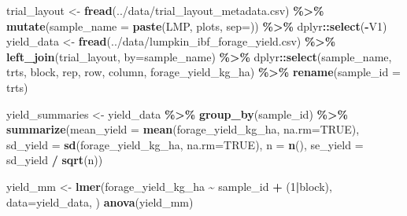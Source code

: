 \documentclass[
]{article}
\newenvironment{Shaded}{\begin{snugshade}}{\end{snugshade}}
\newcommand{\AttributeTok}[1]{\textcolor[rgb]{0.13,0.29,0.53}{#1}}
\newcommand{\ConstantTok}[1]{\textcolor[rgb]{0.56,0.35,0.01}{#1}}
\newcommand{\DecValTok}[1]{\textcolor[rgb]{0.00,0.00,0.81}{#1}}
\newcommand{\FunctionTok}[1]{\textcolor[rgb]{0.13,0.29,0.53}{\textbf{#1}}}
\newcommand{\NormalTok}[1]{#1}
\newcommand{\OtherTok}[1]{\textcolor[rgb]{0.56,0.35,0.01}{#1}}
\newcommand{\SpecialCharTok}[1]{\textcolor[rgb]{0.81,0.36,0.00}{\textbf{#1}}}
\newcommand{\StringTok}[1]{\textcolor[rgb]{0.31,0.60,0.02}{#1}}
\begin{document}
\begin{Shaded}
\begin{Highlighting}[]
\NormalTok{trial\_layout }\OtherTok{\textless{}{-}} \FunctionTok{fread}\NormalTok{(}\StringTok{\textquotesingle{}../data/trial\_layout\_metadata.csv\textquotesingle{}}\NormalTok{) }\SpecialCharTok{\%\textgreater{}\%} 
        \FunctionTok{mutate}\NormalTok{(}\AttributeTok{sample\_name =} \FunctionTok{paste}\NormalTok{(}\StringTok{\textquotesingle{}LMP\textquotesingle{}}\NormalTok{, plots, }\AttributeTok{sep=}\StringTok{\textquotesingle{}{-}\textquotesingle{}}\NormalTok{)) }\SpecialCharTok{\%\textgreater{}\%} 
\NormalTok{        dplyr}\SpecialCharTok{::}\FunctionTok{select}\NormalTok{(}\SpecialCharTok{{-}}\NormalTok{V1)}
\NormalTok{yield\_data }\OtherTok{\textless{}{-}} \FunctionTok{fread}\NormalTok{(}\StringTok{\textquotesingle{}../data/lumpkin\_ibf\_forage\_yield.csv\textquotesingle{}}\NormalTok{) }\SpecialCharTok{\%\textgreater{}\%} 
        \FunctionTok{left\_join}\NormalTok{(trial\_layout, }\AttributeTok{by=}\StringTok{\textquotesingle{}sample\_name\textquotesingle{}}\NormalTok{) }\SpecialCharTok{\%\textgreater{}\%} 
\NormalTok{        dplyr}\SpecialCharTok{::}\FunctionTok{select}\NormalTok{(sample\_name, trts, block, rep, row, column, forage\_yield\_kg\_ha) }\SpecialCharTok{\%\textgreater{}\%} 
        \FunctionTok{rename}\NormalTok{(}\StringTok{\textquotesingle{}sample\_id\textquotesingle{}} \OtherTok{=} \StringTok{\textquotesingle{}trts\textquotesingle{}}\NormalTok{)}

\NormalTok{yield\_summaries }\OtherTok{\textless{}{-}}\NormalTok{ yield\_data }\SpecialCharTok{\%\textgreater{}\%} 
        \FunctionTok{group\_by}\NormalTok{(sample\_id) }\SpecialCharTok{\%\textgreater{}\%} 
        \FunctionTok{summarize}\NormalTok{(}\AttributeTok{mean\_yield =} \FunctionTok{mean}\NormalTok{(forage\_yield\_kg\_ha, }\AttributeTok{na.rm=}\ConstantTok{TRUE}\NormalTok{),}
                  \AttributeTok{sd\_yield =} \FunctionTok{sd}\NormalTok{(forage\_yield\_kg\_ha, }\AttributeTok{na.rm=}\ConstantTok{TRUE}\NormalTok{),}
                  \AttributeTok{n =} \FunctionTok{n}\NormalTok{(),}
                  \AttributeTok{se\_yield =}\NormalTok{ sd\_yield }\SpecialCharTok{/} \FunctionTok{sqrt}\NormalTok{(n))}

\NormalTok{yield\_mm }\OtherTok{\textless{}{-}} \FunctionTok{lmer}\NormalTok{(forage\_yield\_kg\_ha }\SpecialCharTok{\textasciitilde{}}\NormalTok{ sample\_id }\SpecialCharTok{+}\NormalTok{ (}\DecValTok{1}\SpecialCharTok{|}\NormalTok{block), }\AttributeTok{data=}\NormalTok{yield\_data, )}
\FunctionTok{anova}\NormalTok{(yield\_mm)}
\end{Highlighting}
\end{Shaded}
\end{document}
